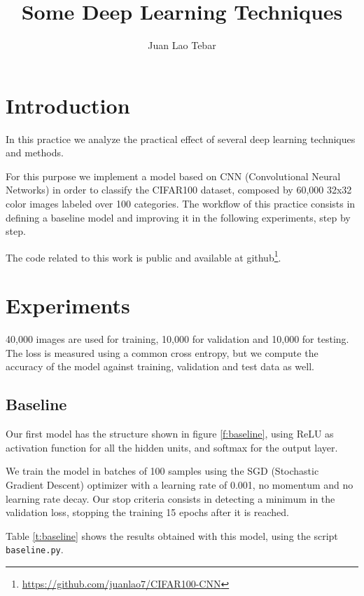 \documentclass[]{article}
\title{Some Deep Learning Techniques}
\author{Juan Lao Tebar}
\begin{document}
\maketitle

\begin{abstract}

\end{abstract}

\section{Introduction}

In this practice we analyze the practical effect of several deep learning techniques and methods.

For this purpose we implement a model based on CNN (Convolutional Neural Networks) in order to classify the CIFAR100 dataset, composed by 60,000 32x32 color images labeled over 100 categories. The workflow of this practice consists in defining a baseline model and improving it in the following experiments, step by step.

The code related to this work is public and available at github\footnote{\url{https://github.com/juanlao7/CIFAR100-CNN}}.

\section{Experiments}

40,000 images are used for training, 10,000 for validation and 10,000 for testing. The loss is measured using a common cross entropy, but we compute the accuracy of the model against training, validation and test data as well.

\subsection{Baseline}

Our first model has the structure shown in figure \ref{f:baseline}, using ReLU as activation function for all the hidden units, and softmax for the output layer.

We train the model in batches of 100 samples using the SGD (Stochastic Gradient Descent) optimizer with a learning rate of 0.001, no momentum and no learning rate decay. Our stop criteria consists in detecting a minimum in the validation loss, stopping the training 15 epochs after it is reached.

Table \ref{t:baseline} shows the results obtained with this model, using the script \texttt{baseline.py}.
\end{document}
